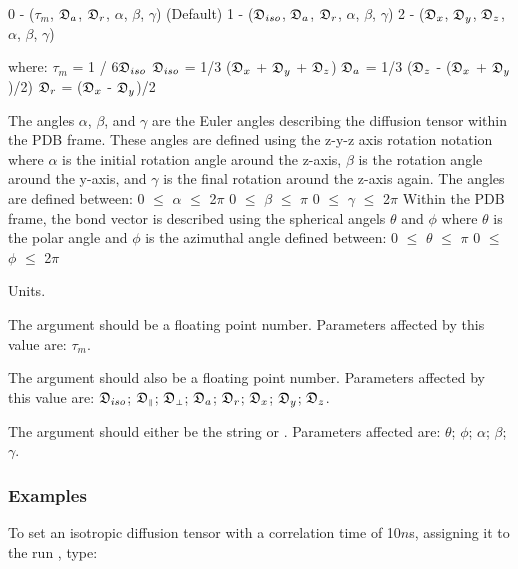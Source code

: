     0 - ($\tau_m$, $\mathfrak{D}_a$, $\mathfrak{D}_r$, $\alpha$, $\beta$, $\gamma$)   (Default)
    1 - ($\mathfrak{D}_{iso}$, $\mathfrak{D}_a$, $\mathfrak{D}_r$, $\alpha$, $\beta$, $\gamma$)
    2 - ($\mathfrak{D}_x$, $\mathfrak{D}_y$, $\mathfrak{D}_z$, $\alpha$, $\beta$, $\gamma$)

where:
    $\tau_m$ = 1 / 6$\mathfrak{D}_{iso}$
    $\mathfrak{D}_{iso}$ = 1/3 ($\mathfrak{D}_x$ + $\mathfrak{D}_y$ + $\mathfrak{D}_z$)
    $\mathfrak{D}_a$ = 1/3 ($\mathfrak{D}_z$ - ($\mathfrak{D}_x$ + $\mathfrak{D}_y$)/2)
    $\mathfrak{D}_r$ = ($\mathfrak{D}_x$ - $\mathfrak{D}_y$)/2

The angles $\alpha$, $\beta$, and $\gamma$ are the Euler angles describing the diffusion tensor
within the PDB frame.  These angles are defined using the z-y-z axis rotation notation where
$\alpha$ is the initial rotation angle around the z-axis, $\beta$ is the rotation angle around the
y-axis, and $\gamma$ is the final rotation around the z-axis again.  The angles are defined
between:
    0 $\le$ $\alpha$ $\le$ 2$\pi$
    0 $\le$ $\beta$ $\le$ $\pi$
    0 $\le$ $\gamma$ $\le$ 2$\pi$
Within the PDB frame, the bond vector is described using the spherical angels $\theta$ and $\phi$
where $\theta$ is the polar angle and $\phi$ is the azimuthal angle defined between:
    0 $\le$ $\theta$ $\le$ $\pi$
    0 $\le$ $\phi$ $\le$ 2$\pi$


Units.

The 
 argument should be a floating point number.  Parameters affected by this
value are:  $\tau_m$.

The 
 argument should also be a floating point number.  Parameters affected by this
value are:  $\mathfrak{D}_{iso}$; $\mathfrak{D}_{\scriptscriptstyle \parallel}$; $\mathfrak{D}_{\scriptscriptstyle \perp}$; $\mathfrak{D}_a$; $\mathfrak{D}_r$; $\mathfrak{D}_x$; $\mathfrak{D}_y$; $\mathfrak{D}_z$.

The 
 argument should either be the string 
 or 
.  Parameters affected
are:  $\theta$; $\phi$; $\alpha$; $\beta$; $\gamma$.



\subsubsection{Examples}

To set an isotropic diffusion tensor with a correlation time of 10$n$s, assigning it to the
run 
, type:



